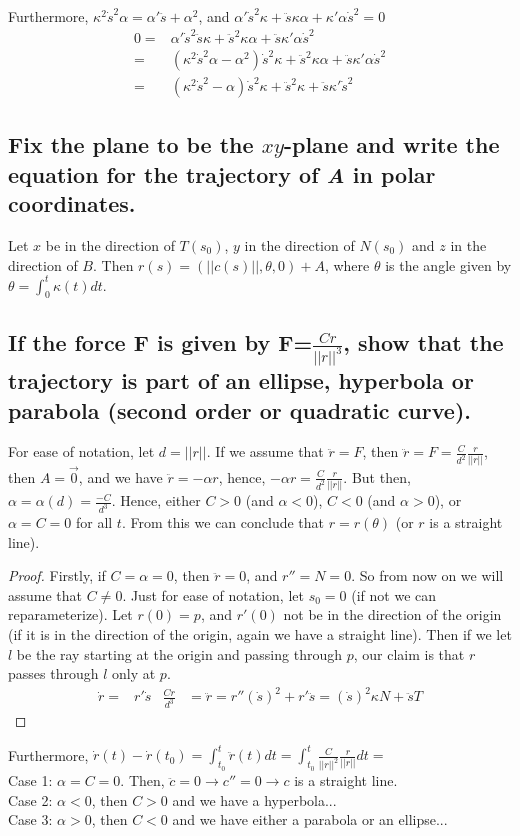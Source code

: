 \documentclass[12pt]{amsart}
\begin{document}
\\Furthermore, $\kappa^2\dot s^2\alpha=\alpha'\ddot s+\alpha^2$, and $\alpha'\dot s^2\kappa+\ddot s\kappa\alpha+\kappa'\alpha\dot s^2=0$
\begin{align*}
	0=&\alpha'\dot s^2\ddot s\kappa+\ddot s^2\kappa\alpha+\ddot s\kappa'\alpha\dot s^2
	\\=&(\kappa^2\dot s^2\alpha-\alpha^2)\dot s^2\kappa+\ddot s^2\kappa\alpha+\ddot s\kappa'\alpha\dot s^2
	\\=&(\kappa^2\dot s^2-\alpha)\dot s^2\kappa+\ddot s^2\kappa+\ddot s\kappa'\dot s^2
\end{align*}

\subsection{Fix the plane to be the $xy$-plane and write the equation for the trajectory of \emph{A} in polar coordinates.}
Let $x$ be in the direction of $T(s_0)$, $y$ in the direction of $N(s_0)$ and $z$ in the direction of $B$. Then $r(s)=(||c(s)||,\theta,0)+A$, where $\theta$ is the angle given by $\theta=\int_0^t\kappa(t)dt$.

\subsection{If the force \textbf{F} is given by \textbf{F}=$\frac{Cr}{||r||^3}$, show that the trajectory is part of an ellipse, hyperbola or parabola (second order or quadratic curve).}
For ease of notation, let $d=||r||$. If we assume that $\ddot r=F$, then $\ddot r=F=\frac{C}{d^2}\frac{r}{||r||}$, then $A=\vec0$, and we have $\ddot r=-\alpha r$, hence, $-\alpha r=\frac{C}{d^2}\frac{r}{||r||}$. But then, $\alpha=\alpha(d)=\frac{-C}{d^3}$. Hence, either $C>0$ (and $\alpha<0$), $C<0$ (and $\alpha>0$), or $\alpha=C=0$ for all $t$. From this we can conclude that $r=r(\theta)$ (or $r$ is a straight line).
\begin{proof}
	Firstly, if $C=\alpha=0$, then $\ddot r=0$, and $r''=N=0$. So from now on we will assume that $C\neq0$. Just for ease of notation, let $s_0=0$ (if not we can reparameterize). Let $r(0)=p$, and $r'(0)$ not be in the direction of the origin (if it is in the direction of the origin, again we have a straight line). Then if we let $l$ be the ray starting at the origin and passing through $p$, our claim is that $r$ passes through $l$ only at $p$.
	\begin{align*}
		\dot r=& r'\dot s & \frac{Cr}{d^3}&=\ddot r=r''(\dot s)^2+r'\ddot s=(\dot s)^2\kappa N+\ddot s T
	\end{align*}
\end{proof}
Furthermore, $\dot r(t)-\dot r(t_0)=\int_{t_0}^t\ddot r(t)dt=\int_{t_0}^t\frac{C}{||r||^2}\frac{r}{||r||}dt=$
\\Case 1: $\alpha=C=0$. Then, $\ddot c=0\rightarrow c''=0\rightarrow c$ is a straight line.
\\Case 2: $\alpha<0$, then $C>0$ and we have a hyperbola...
\\Case 3: $\alpha>0$, then $C<0$ and we have either a parabola or an ellipse...
\end{document}
